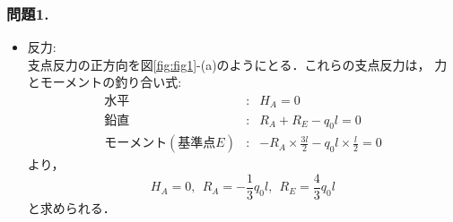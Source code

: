 \documentclass[10pt,a4j]{jarticle}
\begin{document}
\subsubsection*{問題1.}
\begin{itemize}
\item
	{\rm 反力:}\\
	支点反力の正方向を図\ref{fig:fig1}-(a)のようにとる．これらの支点反力は，
	力とモーメントの釣り合い式:
	\begin{eqnarray*}
		水平 &:& H_A=0 \\
		鉛直 &:& R_A+R_E-q_0l=0 \\
		モーメント(基準点E) &:& -R_A \times \frac{3l}{2}-q_0l\times \frac{l}{2}=0
	\end{eqnarray*}
	より，
	\[
		H_A=0, \ \ 
		R_A=-\frac{1}{3}q_0l, \ \ R_E=\frac{4}{3}q_0l
	\]	
	と求められる．\\


\end{itemize}
\end{document}
